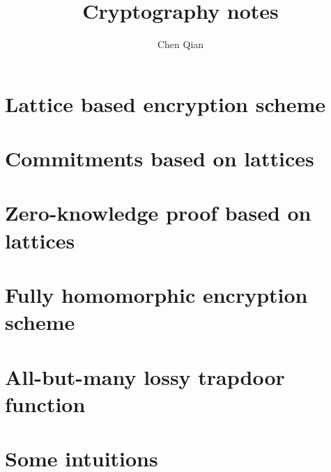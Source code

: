 \documentclass[10pt]{book}
\begin{document}
\pagestyle{plain}



\title{Cryptography notes}

\author{Chen Qian}


\maketitle

\tableofcontents

\chapter{Lattice based encryption scheme }


\chapter{Commitments based on lattices}


\chapter{Zero-knowledge proof based on lattices}


\chapter{Fully homomorphic encryption scheme}


\chapter{All-but-many lossy trapdoor function}


\chapter{Some intuitions}



 
\end{document}
